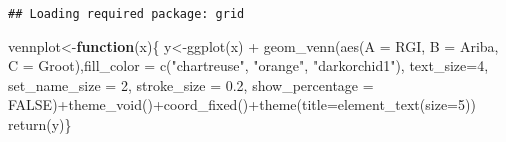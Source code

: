 \documentclass[
]{article}
\newenvironment{Shaded}{\begin{snugshade}}{\end{snugshade}}
\newcommand{\AttributeTok}[1]{\textcolor[rgb]{0.77,0.63,0.00}{#1}}
\newcommand{\ConstantTok}[1]{\textcolor[rgb]{0.00,0.00,0.00}{#1}}
\newcommand{\ControlFlowTok}[1]{\textcolor[rgb]{0.13,0.29,0.53}{\textbf{#1}}}
\newcommand{\DecValTok}[1]{\textcolor[rgb]{0.00,0.00,0.81}{#1}}
\newcommand{\FloatTok}[1]{\textcolor[rgb]{0.00,0.00,0.81}{#1}}
\newcommand{\FunctionTok}[1]{\textcolor[rgb]{0.00,0.00,0.00}{#1}}
\newcommand{\NormalTok}[1]{#1}
\newcommand{\OtherTok}[1]{\textcolor[rgb]{0.56,0.35,0.01}{#1}}
\newcommand{\SpecialCharTok}[1]{\textcolor[rgb]{0.00,0.00,0.00}{#1}}
\newcommand{\StringTok}[1]{\textcolor[rgb]{0.31,0.60,0.02}{#1}}
\begin{document}
\begin{Shaded}
\end{Shaded}

\begin{verbatim}
## Loading required package: grid
\end{verbatim}

\begin{Shaded}
\begin{Highlighting}[]
\NormalTok{vennplot}\OtherTok{\textless{}{-}}\ControlFlowTok{function}\NormalTok{(x)\{}
\NormalTok{y}\OtherTok{\textless{}{-}}\FunctionTok{ggplot}\NormalTok{(x) }\SpecialCharTok{+} \FunctionTok{geom\_venn}\NormalTok{(}\FunctionTok{aes}\NormalTok{(}\AttributeTok{A =}\NormalTok{ RGI, }\AttributeTok{B =}\NormalTok{ Ariba, }\AttributeTok{C =}\NormalTok{ Groot),}\AttributeTok{fill\_color =} \FunctionTok{c}\NormalTok{(}\StringTok{"chartreuse"}\NormalTok{, }\StringTok{"orange"}\NormalTok{, }\StringTok{"darkorchid1"}\NormalTok{), }\AttributeTok{text\_size=}\DecValTok{4}\NormalTok{, }\AttributeTok{set\_name\_size =} \DecValTok{2}\NormalTok{, }\AttributeTok{stroke\_size =} \FloatTok{0.2}\NormalTok{, }\AttributeTok{show\_percentage =} \ConstantTok{FALSE}\NormalTok{)}\SpecialCharTok{+}\FunctionTok{theme\_void}\NormalTok{()}\SpecialCharTok{+}\FunctionTok{coord\_fixed}\NormalTok{()}\SpecialCharTok{+}\FunctionTok{theme}\NormalTok{(}\AttributeTok{title=}\FunctionTok{element\_text}\NormalTok{(}\AttributeTok{size=}\DecValTok{5}\NormalTok{))}
  \FunctionTok{return}\NormalTok{(y)\}}
\end{Highlighting}
\end{Shaded}
\end{document}
